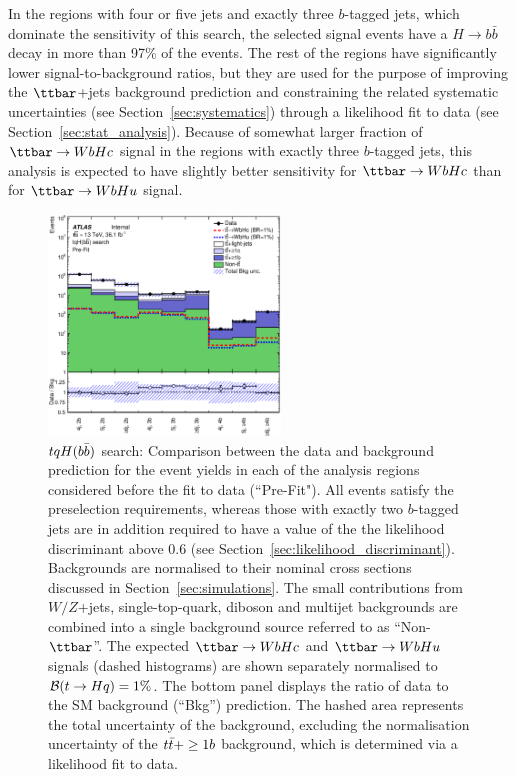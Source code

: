 In the regions with four or five jets and exactly three $b$-tagged jets, which dominate the sensitivity of this search, 
the selected signal events have a $H \to b\bar{b}$ decay in more than 97\% of the events.
The rest of the regions have significantly lower signal-to-background ratios, but they are used for the purpose of improving 
the $\ttbar$+jets background prediction and constraining the related systematic uncertainties (see Section~\ref{sec:systematics})
through a likelihood fit to data (see Section~\ref{sec:stat_analysis}).  
Because of somewhat larger fraction of $\Hc$ signal in the regions with exactly three $b$-tagged jets,
this analysis is expected to have slightly better sensitivity for $\Hc$ than for $\Hu$ signal.

\begin{figure}[t]
\begin{center}
\includegraphics[width=0.55\textwidth]{figures/Hbb/fit/cH_plots/Summary.eps}
\caption{$tqH(b\bar{b})$ search: Comparison between the data and background prediction for the event yields in each of the analysis regions considered 
before the fit to data (``Pre-Fit"). All events satisfy the preselection requirements, whereas those with exactly two $b$-tagged jets are
in addition required to have a value of the the likelihood discriminant above 0.6 (see Section~\ref{sec:likelihood_discriminant}).
Backgrounds are normalised to their nominal cross sections discussed in Section~\ref{sec:simulations}.
The small contributions from $W/Z$+jets,  single-top-quark, diboson and multijet backgrounds are combined into a single background source 
referred to as ``Non-$\ttbar$''. 
The expected $\Hc$ and $\Hu$ signals (dashed histograms) are shown separately normalised to $\mathcal{B}(t\to Hq)=1\%$.
The bottom panel displays the ratio of data to the SM background (``Bkg'') prediction. 
The hashed area represents the total uncertainty of the background, excluding the normalisation uncertainty of the $t\bar{t}+\geq1b$ background, 
which is determined via a likelihood fit to data.} 
\label{fig:Hbb_Summary}
\end{center}
\end{figure}

